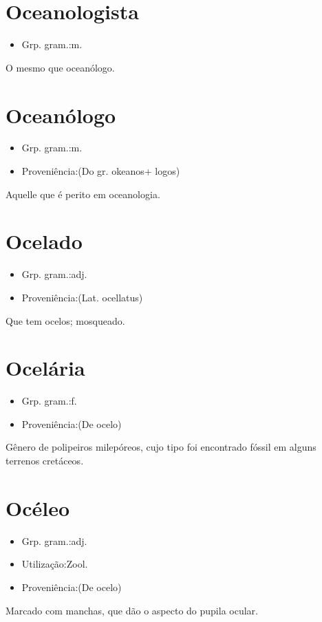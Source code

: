 \section{Oceanologista}
\begin{itemize}
\item {Grp. gram.:m.}
\end{itemize}
O mesmo que \textunderscore oceanólogo\textunderscore .
\section{Oceanólogo}
\begin{itemize}
\item {Grp. gram.:m.}
\end{itemize}
\begin{itemize}
\item {Proveniência:(Do gr. \textunderscore okeanos\textunderscore  + \textunderscore logos\textunderscore )}
\end{itemize}
Aquelle que é perito em oceanologia.
\section{Ocelado}
\begin{itemize}
\item {Grp. gram.:adj.}
\end{itemize}
\begin{itemize}
\item {Proveniência:(Lat. \textunderscore ocellatus\textunderscore )}
\end{itemize}
Que tem ocelos; mosqueado.
\section{Ocelária}
\begin{itemize}
\item {Grp. gram.:f.}
\end{itemize}
\begin{itemize}
\item {Proveniência:(De \textunderscore ocelo\textunderscore )}
\end{itemize}
Gênero de polipeiros milepóreos, cujo tipo foi encontrado fóssil em alguns terrenos cretáceos.
\section{Océleo}
\begin{itemize}
\item {Grp. gram.:adj.}
\end{itemize}
\begin{itemize}
\item {Utilização:Zool.}
\end{itemize}
\begin{itemize}
\item {Proveniência:(De \textunderscore ocelo\textunderscore )}
\end{itemize}
Marcado com manchas, que dão o aspecto do pupila ocular.
